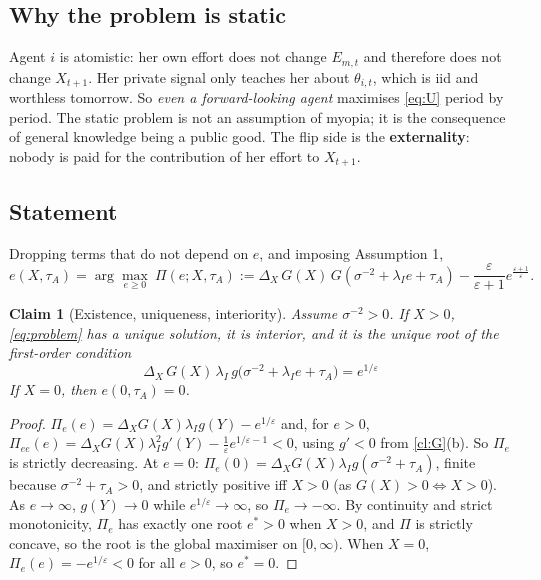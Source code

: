 \documentclass[11pt,a4paper]{article}
\newtheorem{claim}{Claim}[section]
\theoremstyle{definition}
\theoremstyle{remark}
\newcommand{\tA}{\tau_A}
\newcommand{\lI}{\lambda_I}
\begin{document}
\subsection{Why the problem is static}
Agent $i$ is atomistic: her own effort does not change $E_{m,t}$ and therefore does not change
$X_{t+1}$. Her private signal only teaches her about $\theta_{i,t}$, which is iid and worthless tomorrow.
So \emph{even a forward-looking agent} maximises \eqref{eq:U} period by period. The static problem is not
an assumption of myopia; it is the consequence of general knowledge being a public good. The flip side is
the \textbf{externality}: nobody is paid for the contribution of her effort to $X_{t+1}$.

\subsection{Statement}
Dropping terms that do not depend on $e$, and imposing Assumption 1,
\begin{equation}\label{eq:problem}
e(X,\tA)=\arg\max_{e\ge0}\ \Pi(e;X,\tA):=\Delta_X\,G(X)\,G(\sigma^{-2}+\lI e+\tA)-
\frac{\varepsilon}{\varepsilon+1}e^{\frac{\varepsilon+1}{\varepsilon}}.
\end{equation}

\begin{claim}[Existence, uniqueness, interiority]\label{cl:br}
Assume $\sigma^{-2}>0$. If $X>0$, \eqref{eq:problem} has a unique solution, it is interior, and it is the
unique root of the first-order condition
\begin{equation}\label{eq:foc}
\boxed{\;\Delta_X\,G(X)\,\lI\,g\bigl(\sigma^{-2}+\lI e+\tA\bigr)=e^{1/\varepsilon}\;}
\end{equation}
If $X=0$, then $e(0,\tA)=0$.
\end{claim}
\begin{proof}
$\Pi_e(e)=\Delta_XG(X)\lI g(Y)-e^{1/\varepsilon}$ and, for $e>0$,
$\Pi_{ee}(e)=\Delta_XG(X)\lI^2g'(Y)-\tfrac1\varepsilon e^{1/\varepsilon-1}<0$, using $g'<0$ from
\cref{cl:G}(b). So $\Pi_e$ is strictly decreasing. At $e=0$: $\Pi_e(0)=\Delta_XG(X)\lI g(\sigma^{-2}+\tA)$,
finite because $\sigma^{-2}+\tA>0$, and strictly positive iff $X>0$ (as $G(X)>0\iff X>0$). As $e\to\infty$,
$g(Y)\to0$ while $e^{1/\varepsilon}\to\infty$, so $\Pi_e\to-\infty$. By continuity and strict monotonicity,
$\Pi_e$ has exactly one root $e^*>0$ when $X>0$, and $\Pi$ is strictly concave, so the root is the global
maximiser on $[0,\infty)$. When $X=0$, $\Pi_e(e)=-e^{1/\varepsilon}<0$ for all $e>0$, so $e^*=0$.
\end{proof}
\end{document}
